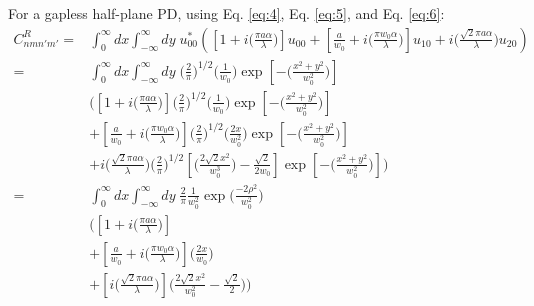 \documentclass[aps,twoside,secnumarabic,balancelastpage,amsmath,amssymb,nofootinbib,hyperref=pdftex]{revtex4}
\begin{document}
For a gapless half-plane PD, using Eq. \ref{eq:4}, Eq. \ref{eq:5}, and Eq. \ref{eq:6}:
\begin{align*}
C_{nmn'm'}^{R} = &\int_{0}^{\infty} dx\int_{-\infty}^{\infty}  dy \;
u_{00}^*
\left(
\left[
				1+
				i \big( \frac{ \pi a \alpha}{ \lambda} \big)
			\right]
			u_{00}
			+
			\left[
			\frac{a}{w_{0}}		
			+
			i  \big( \frac{\pi w_{0} \alpha}{\lambda} \big)
			\right]			
			u_{10}
			+
			i  
				\big( \frac{\sqrt{2} \pi a \alpha}{ \lambda} \big)
			u_{20}
\right) 
\\=& 
\int_{0}^{\infty} dx\int_{-\infty}^{\infty}  dy \;
\big( \frac{2}{\pi} \big)^{1/2} 
\big( \frac{1}{w_{0}} \big)
\exp \left[ - \big( \frac{x^{2}+y^{2}}{w_{0}^{2}} \big) \right]
\\ &
\big(
    \left[
                    1+
                    i \big( \frac{ \pi a \alpha}{ \lambda} \big)
                \right]
                \big( \frac{2}{\pi} \big)^{1/2} 
\big( \frac{1}{w_{0}} \big)
\exp \left[ - \big( \frac{x^{2}+y^{2}}{w_{0}^{2}} \big) \right]
              \\ &  +
                \left[
                \frac{a}{w_{0}}		
                +
                i  \big( \frac{\pi w_{0} \alpha}{\lambda} \big)
                \right]			
                 \big( \frac{2}{\pi} \big)^{1/2}
\big( \frac{2x}{w_{0}^{2}}\big)
\exp \left[ - \big( \frac{x^{2}+y^{2}}{w_{0}^{2}} \big) \right]
              \\ &   +
                i  
                    \big( \frac{\sqrt{2} \pi a \alpha}{ \lambda} \big)
                \big( \frac{2}{\pi} \big)^{1/2}
\left[ \big( \frac{2 \sqrt{2}x^{2}}{w_{0}^{3}} \big)- \frac{\sqrt{2}}{2 w_0} \right]
\exp \left[ - \big( \frac{x^{2}+y^{2}}{w_{0}^{2}} \big) \right]
    \big )  
   \\ =&
   \int_{0}^{\infty} dx\int_{-\infty}^{\infty}  dy \;
\frac{2}{\pi}
		\frac{1}{w_0^2}
		\exp \big( \frac{-2\rho^2}{w_0^{2}} \big)
		\\& \Big(
        \left[
				1+
				i \big( \frac{ \pi a \alpha}{ \lambda} \big)
			\right]
          \\ &  +	
        			\left[
			\frac{a}{w_{0}}		
			+
			i  \big( \frac{\pi w_{0} \alpha}{\lambda} \big)
			\right]	
			\Big( \frac{2 x}{w_0} \Big)
            \\ & +
            \left[i  
				\big( \frac{\sqrt{2} \pi a \alpha}{ \lambda} \big)\right]
                \big(
                    \frac{2 \sqrt{2} x^2}{w_0^2}
                    -
                    \frac{\sqrt{2} }{2}
                \big)
                \Big)
\end{align*}
\end{document}
